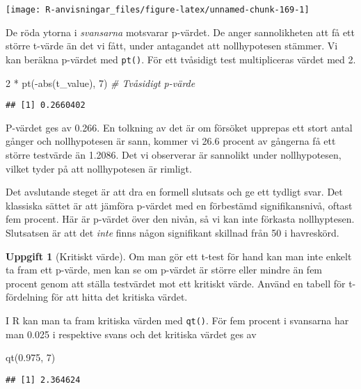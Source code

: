 \documentclass[
]{book}
\newenvironment{Shaded}{\begin{snugshade}}{\end{snugshade}}
\newcommand{\CommentTok}[1]{\textcolor[rgb]{0.56,0.35,0.01}{\textit{#1}}}
\newcommand{\DecValTok}[1]{\textcolor[rgb]{0.00,0.00,0.81}{#1}}
\newcommand{\FloatTok}[1]{\textcolor[rgb]{0.00,0.00,0.81}{#1}}
\newcommand{\FunctionTok}[1]{\textcolor[rgb]{0.00,0.00,0.00}{#1}}
\newcommand{\NormalTok}[1]{#1}
\newcommand{\SpecialCharTok}[1]{\textcolor[rgb]{0.00,0.00,0.00}{#1}}
\theoremstyle{definition}
\theoremstyle{definition}
\theoremstyle{definition}
\newtheorem{exercise}{Uppgift}[chapter]
\theoremstyle{definition}
\theoremstyle{remark}
\begin{document}
\begin{center}\texttt{[image: R-anvisningar\_files/figure-latex/unnamed-chunk-169-1]} \end{center}

De röda ytorna i \emph{svansarna} motsvarar p-värdet. De anger sannolikheten att få ett större t-värde än det vi fått, under antagandet att nollhypotesen stämmer. Vi kan beräkna p-värdet med \texttt{pt()}. För ett tvåsidigt test multipliceras värdet med 2.

\begin{Shaded}
\begin{Highlighting}[]
\DecValTok{2} \SpecialCharTok{*} \FunctionTok{pt}\NormalTok{(}\SpecialCharTok{{-}}\FunctionTok{abs}\NormalTok{(t\_value), }\DecValTok{7}\NormalTok{) }\CommentTok{\# Tvåsidigt p{-}värde}
\end{Highlighting}
\end{Shaded}

\begin{verbatim}
## [1] 0.2660402
\end{verbatim}

P-värdet ges av 0.266. En tolkning av det är om försöket upprepas ett stort antal gånger och nollhypotesen är sann, kommer vi 26.6 procent av gångerna få ett större testvärde än 1.2086. Det vi observerar är sannolikt under nollhypotesen, vilket tyder på att nollhypotesen är rimligt.

Det avslutande steget är att dra en formell slutsats och ge ett tydligt svar. Det klassiska sättet är att jämföra p-värdet med en förbestämd signifikansnivå, oftast fem procent. Här är p-värdet över den nivån, så vi kan inte förkasta nollhyptesen. Slutsatsen är att det \emph{inte} finns någon signifikant skillnad från 50 i havreskörd.

\begin{exercise}[Kritiskt värde]

Om man gör ett t-test för hand kan man inte enkelt ta fram ett p-värde, men kan se om p-värdet är större eller mindre än fem procent genom att ställa testvärdet mot ett kritiskt värde. Använd en tabell för t-fördelning för att hitta det kritiska värdet.

I R kan man ta fram kritiska värden med \texttt{qt()}. För fem procent i svansarna har man 0.025 i respektive svans och det kritiska värdet ges av

\begin{Shaded}
\begin{Highlighting}[]
\FunctionTok{qt}\NormalTok{(}\FloatTok{0.975}\NormalTok{, }\DecValTok{7}\NormalTok{)}
\end{Highlighting}
\end{Shaded}

\begin{verbatim}
## [1] 2.364624
\end{verbatim}

\end{exercise}
\end{document}

